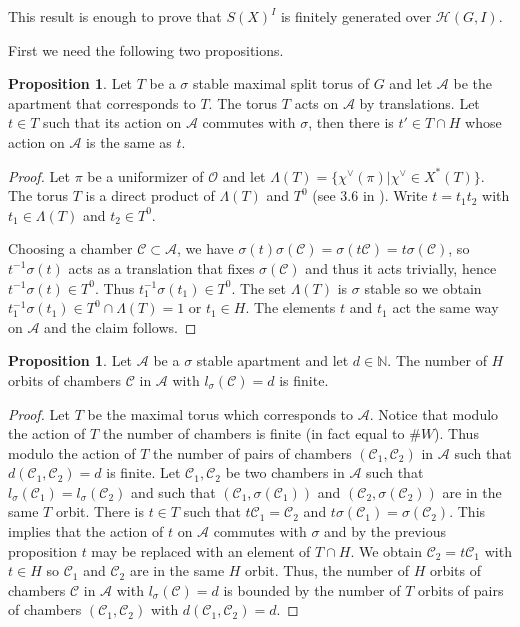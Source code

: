 \documentclass[12pt]{article}
\newcommand{\A}{\mathcal{A}}
\newcommand{\C}{\mathcal{C}}
\newcommand{\s}{\mathcal{O}}
\newcommand{\<}{\langle}
\renewcommand{\>}{\rangle}
\theoremstyle{plain}
\theoremstyle{definition}
\newtheorem{prop}[theorem]{Proposition}
\begin{document}
This result is enough to prove that $S(X)^I$ is finitely generated over ${\mathcal H}(G,I).$

First we need the following two propositions.

\begin{prop}
    Let $T$ be a $\sigma$ stable maximal split torus of $G$ and let $\A$ be the apartment that corresponds to $T$. The torus $T$ acts on $\A$ by translations. Let $t\in T$ such that its action on $\A$ commutes with $\sigma$, then there is $t'\in T\cap H$ whose action on $\A$ is the same as $t$.
\end{prop}

\begin{proof}
    Let $\pi$ be a uniformizer of $\s$ and let $\Lambda(T)=\{\chi^\vee(\pi)|\chi^\vee\in X^*(T)\}$. The torus $T$ is a direct product of $\Lambda(T)$ and $T^0$ (see 3.6 in \cite{delorm}). Write $t=t_1t_2$ with $t_1\in\Lambda(T)$ and $t_2\in T^0$.

    Choosing a chamber $\C\subset\A$, we have $\sigma(t)\sigma(\C)=\sigma(t\C)=t\sigma(\C)$, so $t^{-1}\sigma(t)$ acts as a translation that fixes $\sigma(\C)$ and thus it acts trivially, hence $t^{-1}\sigma(t)\in T^0$. Thus $t_1^{-1}\sigma(t_1)\in T^0$. The set $\Lambda(T)$ is $\sigma$ stable so we obtain $t^{-1}_1\sigma(t_1)\in T^0\cap\Lambda(T)=1$ or $t_1\in H$. The elements $t$ and $t_1$ act the same way on $\A$ and the claim follows.
\end{proof}

\begin{prop}
    Let $\A$ be a $\sigma$ stable apartment and let $d\in\mathbb{N}$. The number of $H$ orbits of chambers $\C$ in $\A$ with $l_\sigma(\C)=d$ is finite. 
\end{prop}

\begin{proof}
    Let $T$ be the maximal torus which corresponds to $\A$. Notice that modulo the action of $T$ the number of chambers is finite (in fact equal to $\#W$). Thus modulo the action of $T$ the number of pairs of chambers $(\C_1,\C_2)$ in $\A$ such that $d(\C_1,\C_2)=d$ is finite. Let $\C_1,\C_2$ be two chambers in $\A$ such that $l_\sigma(\C_1)=l_\sigma(\C_2)$ and such that $(\C_1,\sigma(\C_1))$ and $(\C_2,\sigma(\C_2))$ are in the same $T$ orbit. There is $t\in T$ such that $t\C_1=\C_2$ and $t\sigma(\C_1)=\sigma(\C_2)$. This implies that the action of $t$ on $\A$ commutes with $\sigma$ and by the previous proposition $t$ may be replaced with an element of $T\cap H$. We obtain $\C_2=t\C_1$ with $t\in H$ so $\C_1$ and $\C_2$ are in the same $H$ orbit. Thus, the number of $H$ orbits of chambers $\C$ in $\A$ with $l_\sigma(\C)=d$ is bounded by the number of $T$ orbits of pairs of chambers $(\C_1,\C_2)$ with $d(\C_1,\C_2)=d$.
\end{proof}
\end{document}
